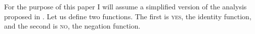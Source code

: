 \documentclass[output=paper,colorlinks,citecolor=brown]{langscibook}
\begin{document}
For the purpose of this paper I will assume a simplified version of the analysis proposed in \citet{hamblin1973questions, karttunen1977syntax}. %
Let us define two functions. The first is \textsc{yes}, the identity function, and the second is \textsc{no}, the negation function.%
\end{document}
